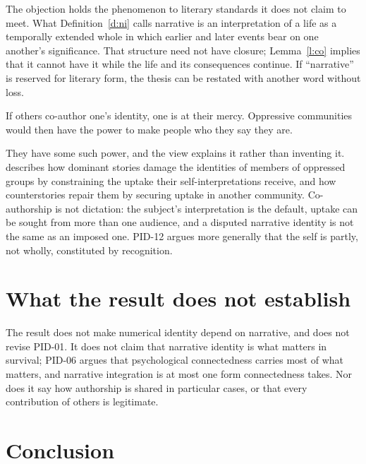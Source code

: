 \documentclass{situationist-preprint}
\begin{document}
\begin{reply}
The objection holds the phenomenon to literary standards it does not claim to meet. What Definition~\ref{d:ni} calls narrative is an interpretation of a life as a temporally extended whole in which earlier and later events bear on one another's significance. That structure need not have closure; Lemma~\ref{l:co} implies that it cannot have it while the life and its consequences continue. If \enquote{narrative} is reserved for literary form, the thesis can be restated with another word without loss.
\end{reply}

\begin{objection}[Autonomy]
If others co-author one's identity, one is at their mercy. Oppressive communities would then have the power to make people who they say they are.
\end{objection}

\begin{reply}
They have some such power, and the view explains it rather than inventing it. \citet{LindemannNelson2001} describes how dominant stories damage the identities of members of oppressed groups by constraining the uptake their self-interpretations receive, and how counterstories repair them by securing uptake in another community. Co-authorship is not dictation: the subject's interpretation is the default, uptake can be sought from more than one audience, and a disputed narrative identity is not the same as an imposed one. PID-12 argues more generally that the self is partly, not wholly, constituted by recognition.
\end{reply}

\section{What the result does not establish}

The result does not make numerical identity depend on narrative, and does not revise PID-01. It does not claim that narrative identity is what matters in survival; PID-06 argues that psychological connectedness carries most of what matters, and narrative integration is at most one form connectedness takes. Nor does it say how authorship is shared in particular cases, or that every contribution of others is legitimate.

\section{Conclusion}
\end{document}
